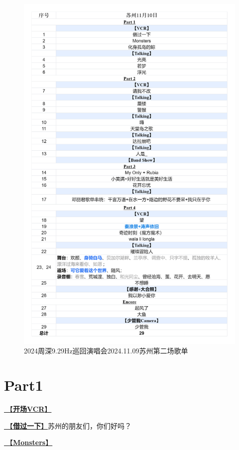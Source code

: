 \documentclass[]{ctexbook}
\begin{document}
\begin{figure}

{\centering \includegraphics[width=320pt]{img/playlists/playlists-suzhou-20241110} 

}

\caption{2024周深9.29Hz巡回演唱会2024.11.09苏州第二场歌单}\label{fig:unnamed-chunk-111}
\end{figure}

\newpage

\section{Part1}\label{suzhou-20241110-part1}

\hyperref[opening-vcr]{🎥【\textbf{开场VCR}】}

\hyperref[I-will-go-my-way]{🎵【\textbf{借过一下}】}苏州的朋友们，你们好吗？

\hyperref[Monsters]{🎵【\textbf{Monsters}】}
\end{document}
